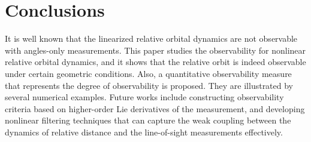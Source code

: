 %
%
%
%
%






\section{Conclusions}

It is well known that the linearized relative orbital dynamics are not observable with angles-only
measurements. This paper studies the observability for nonlinear relative orbital dynamics, and it shows that the relative orbit is indeed observable under certain geometric conditions. Also, a quantitative observability measure that represents the degree of observability is proposed. They are illustrated by several numerical examples. Future works include constructing observability criteria based on higher-order Lie derivatives of the measurement, and developing nonlinear filtering techniques that can capture the weak coupling between the dynamics of relative distance and the line-of-sight measurements effectively.

